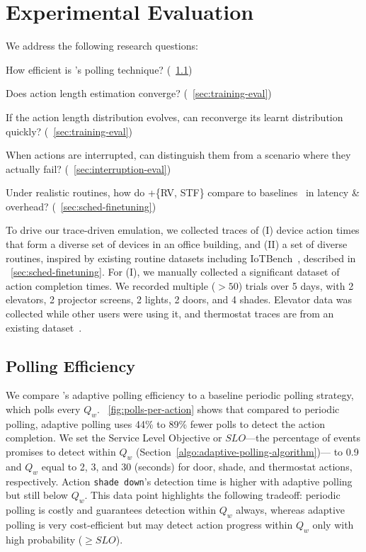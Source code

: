 \vspace*{-0.3cm} 

\section{Experimental Evaluation}
\label{sec:eval}

We address the following research questions:
\squishenum
    \item How efficient is \sysname's polling technique? (\Section~\ref{sec:detection_times})
    \item Does action length estimation converge? (\Section~\ref{sec:training-eval}) 
    \item If the action length distribution evolves, can \sysname{} reconverge its learnt distribution quickly? (\Section~\ref{sec:training-eval})
    \item When actions are interrupted, can \sysname{} distinguish them from a scenario where they actually fail? (\Section~\ref{sec:interruption-eval})
    \item Under realistic routines, how do 
        \scheduler+\{RV, STF\} compare to baselines~\cite{SafeHomeEuroSys2021} {in latency \& overhead}? (\Section~\ref{sec:sched-finetuning})
\squishend

To drive our trace-driven emulation, we collected traces of (I) device action times that form a diverse set of devices in an office building, and (II) a set of diverse routines, inspired by existing routine datasets including IoTBench~\cite{iotbench,smartthingsapps}, described in \Section~\ref{sec:sched-finetuning}.
%
For (I), we manually collected a significant dataset of action completion times. We recorded multiple ($>50$) trials over 5 days, with 2 elevators, 2 projector screens, 2 lights, 2 doors, and 4 shades. Elevator data was collected while other users were using it, and thermostat traces are from an existing dataset~\cite{fraunhofer_thermostat_2022}.

\subsection{\sysname{} Polling Efficiency}
\label{sec:detection_times}

We compare \sysname's adaptive polling efficiency to a baseline periodic polling strategy, which polls every $Q_w$.
\Figure~\ref{fig:polls-per-action} shows that compared to periodic polling, adaptive polling uses 44\% to 89\% fewer polls to detect the action completion. 
We set the Service Level Objective or $SLO$---the percentage of events \sysname{} promises to detect within $Q_w$ (Section~\ref{algo:adaptive-polling-algorithm})---
to 0.9 and $Q_w$ equal to 2, 3, and 30 (seconds) for door, shade, and thermostat actions, respectively. 
Action \texttt{shade down}'s detection time is higher with adaptive polling but still below $Q_w$. This data point highlights the following tradeoff: periodic polling is costly and guarantees detection within $Q_w$ always, whereas adaptive polling is very cost-efficient but may detect action progress within $Q_w$ only with high probability ($\ge SLO$). 

